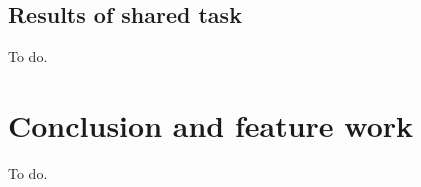 \documentclass[11pt,a4paper]{article}
\begin{document}
\subsection{Results of shared task}
To do.

\section{Conclusion and feature work}
To do.



\end{document}
